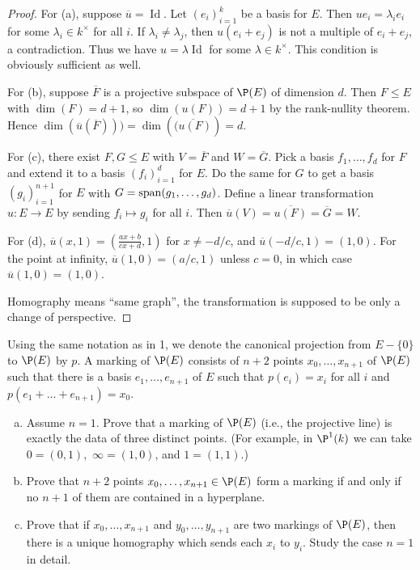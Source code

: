 \documentclass{article}
\DeclareMathOperator{\Id}{Id}
\begin{document}
\begin{proof}
For (a), suppose $\overline u = \Id$. Let $(e_i)_{i=1}^k$ be a basis for $E$.  Then $u e_i = \lambda_i e_i$ for some $\lambda_i \in k^\times$ for all $i$. If $\lambda_i \neq \lambda_j$, then $u(e_i + e_j)$ is not a multiple of $e_i + e_j$, a contradiction.  Thus we have $u = \lambda \Id$ for some $\lambda \in k^\times$.  This condition is obviously sufficient as well.

For (b),  suppose $\overline F$ is a projective subspace of $\P(E)$ of dimension $d$.  Then $F \le E$ with $\dim(F) = d + 1$, so $\dim(u(F)) = d + 1$ by the rank-nullity theorem. Hence $\dim(\overline u (\overline F))) = \dim(\overline{(u(F)}) = d$.

For (c), there exist $F,G \le E$ with $V = \overline F$ and $W = \overline G$. Pick a basis $f_1, \ldots, f_d$ for $F$ and extend it to a basis $(f_i)_{i=1}^d$ for $E$.  Do the same for $G$ to get a basis $(g_i)_{i=1}^{n+1}$ for $E$ with $G = \operatorname{span}(g_1, \ldots, g_d)$.  Define a linear transformation $u:E \to E$ by sending $f_i \mapsto g_i$ for all $i$. Then $\overline u(V) = \overline {u(F)} = \overline G = W$.

For (d),  $\overline u (x,1) = (\frac{ax +b}{cx + d}, 1)$ for $x \neq -d/c$, and $\overline u (-d/c, 1) = (1, 0)$.  For the point at infinity, $\overline u (1, 0) = (a/c, 1)$ unless $c = 0$, in which case $\overline u (1, 0) = (1, 0)$.

Homography means ``same graph'', the transformation is supposed to be only a change of perspective.
\end{proof}


 Using the same notation as in 1, we denote the canonical projection from $E - \{0\}$ to $\P(E)$ by $p$. A marking of $\P(E)$ consists of $n + 2$ points $x_0, \ldots, x_{n+1}$ of $\P(E)$ such that there is a basis $e_1, \ldots, e_{n+1}$ of $E$ such that $p(e_i) = x_i$ for all $i$ and $p(e_1 + \ldots + e_{n+1}) = x_0$.

\begin{enumerate}[a)]
\item Assume $n = 1$. Prove that a marking of $\P(E)$ (i.e., the projective line) is exactly the data of three distinct points. (For example, in $\P^1(k)$ we can take $0 = (0,1),$ $\infty = (1,0)$, and $1 = (1,1)$.)

\item Prove that $n + 2$ points $x_0, \ldots, x_{n+1} \in \P(E)$ form a marking if and only if no $n+1$ of them are contained in a hyperplane.

\item Prove that if $x_0, \ldots, x_{n+1}$ and $y_0, \ldots, y_{n+1}$ are two markings of $\P(E)$, then there is a unique homography which sends each $x_i$ to $y_i$. Study the case $n = 1$ in detail.
\end{enumerate}
\end{document}
